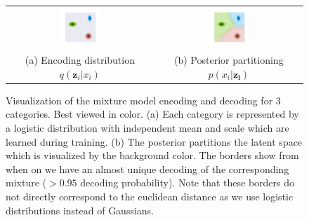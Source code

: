 \begin{figure}[t!]
    \centering
    \setlength{\tabcolsep}{20pt}
    \begin{tabular}{cc}
        \includegraphics[width=0.28\textwidth]{figures/appendix_figures/encoding_dist_mixture_pure.pdf} & \includegraphics[width=0.28\textwidth]{figures/appendix_figures/encoding_dist_mixture.pdf} \\[3.5mm]
        (a) Encoding distribution $q(\bm{z}_i|x_i)$ & (b) Posterior partitioning $p(x_i|\bm{z_i})$ \\
    \end{tabular}
    \caption[Mixture model encoding]{Visualization of the mixture model encoding and decoding for 3 categories. Best viewed in color. (a) Each category is represented by a logistic distribution with independent mean and scale which are learned during training. (b) The posterior partitions the latent space which is visualized by the background color. The borders show from when on we have an almost unique decoding of the corresponding mixture ($>0.95$ decoding probability). Note that these borders do not directly correspond to the euclidean distance as we use logistic distributions instead of Gaussians.}
    \label{fig:methodology_encoding_dist_mixt}
\end{figure}

